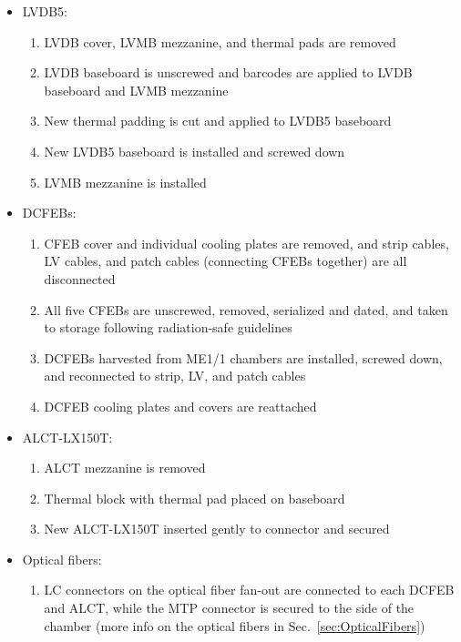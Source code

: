 \begin{itemize}
    \item LVDB5:
    \begin{enumerate}
        \item LVDB cover, LVMB mezzanine, and thermal pads are removed
        \item LVDB baseboard is unscrewed and barcodes are applied to LVDB baseboard and LVMB mezzanine
        \item New thermal padding is cut and applied to LVDB5 baseboard
        \item New LVDB5 baseboard is installed and screwed down
        \item LVMB mezzanine is installed
    \end{enumerate}
    \item DCFEBs:
    \begin{enumerate}
        \item CFEB cover and individual cooling plates are removed, and strip cables, LV cables, and patch cables (connecting CFEBs together) are all disconnected
        \item All five CFEBs are unscrewed, removed, serialized and dated, and taken to storage following radiation-safe guidelines
        \item DCFEBs harvested from ME1/1 chambers are installed, screwed down, and reconnected to strip, LV, and patch cables
        \item DCFEB cooling plates and covers are reattached
    \end{enumerate}
    \item ALCT-LX150T:
    \begin{enumerate}
        \item ALCT mezzanine is removed
        \item Thermal block with thermal pad placed on baseboard
        \item New ALCT-LX150T inserted gently to connector and secured
    \end{enumerate}
    \item Optical fibers:
    \begin{enumerate}
        \item LC connectors on the optical fiber fan-out are connected to each DCFEB and ALCT, while the MTP connector is secured to the side of the chamber (more info on the optical fibers in Sec.~\ref{sec:OpticalFibers})
    \end{enumerate}
\end{itemize}

